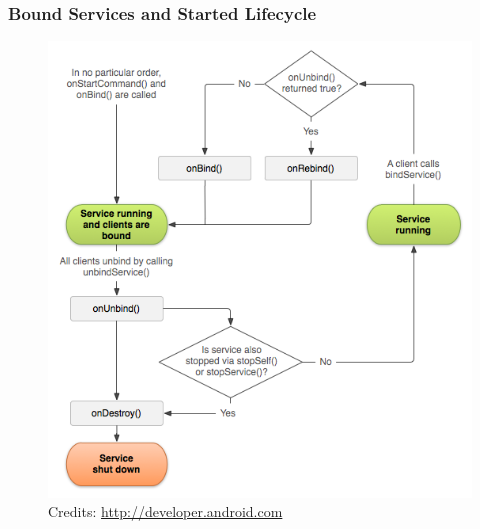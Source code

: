 \begin{frame}
  \frametitle{Bound Services and Started Lifecycle}
  \begin{figure}[h!]
    \centering
    \includegraphics[height=0.8\textheight]{slides/android-application-services/service-start-bound-lifecycle.png}\\
    {
      \tiny
      Credits: \url{http://developer.android.com}
    }
  \end{figure}
\end{frame}
